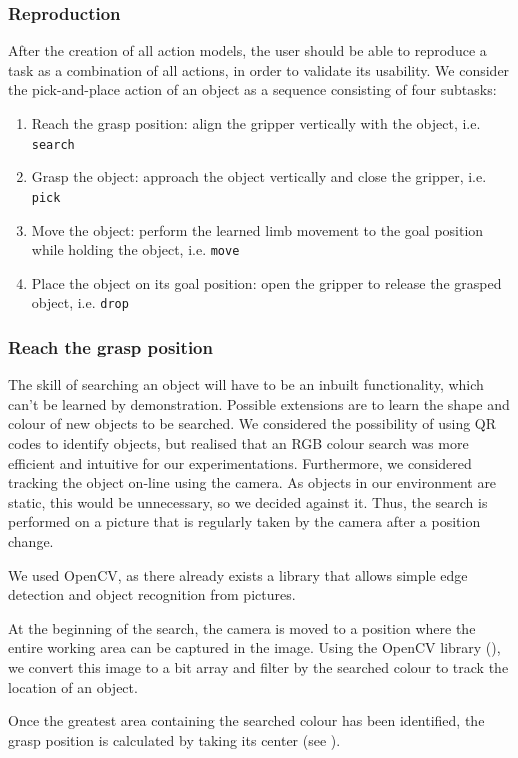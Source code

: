 \subsubsection{Reproduction}
After the creation of all action models, the user should be able to reproduce a task as a combination of all actions, in order to validate its usability.
We consider the pick-and-place action of an object as a sequence consisting of four subtasks:
\begin{enumerate}
	\item Reach the grasp position: align the gripper vertically with the object, i.e.
	\texttt{search}
	\item Grasp the object: approach the object vertically and close the gripper, i.e.
	\texttt{pick}
	\item Move the object: perform the learned limb movement to the goal position while holding the object, i.e.
	\texttt{move}
	\item Place the object on its goal position: open the gripper to release the grasped object, i.e.
	\texttt{drop}
\end{enumerate}

\subsubsection{Reach the grasp position}\label{Object Search}
The skill of searching an object will have to be an inbuilt functionality, which can't be learned by demonstration.
Possible extensions are to learn the shape and colour of new objects to be searched.
We considered the possibility of using QR codes to identify objects, but realised that an RGB colour search was more efficient and intuitive for our experimentations.
Furthermore, we considered tracking the object on-line using the camera.
As objects in our environment are static, this would be unnecessary, so we decided against it.
Thus, the search is performed on a picture that is regularly taken by the camera after a position change.

We used OpenCV, as there already exists a library that allows simple edge detection and object recognition from pictures.

At the beginning of the search, the camera is moved to a position where the entire working area can be captured in the image.
Using the OpenCV library (\cite{opencv}), we convert this image to a bit array and filter by the searched colour to track the location of an object.

Once the greatest area containing the searched colour has been identified, the grasp position is calculated by taking its center (see ).

